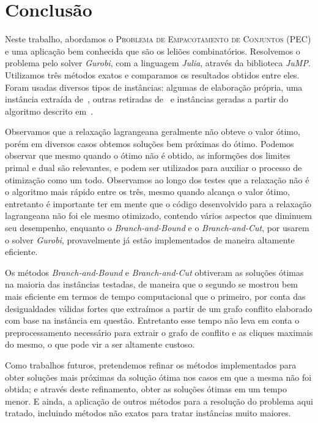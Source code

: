 \documentclass{article}
\begin{document}
    
	\section{Conclusão}\label{sec:concl}
	Neste trabalho, abordamos o \textsc{Problema de Empacotamento de Conjuntos} (PEC) e uma aplicação bem conhecida que são os leliões combinatórios. Resolvemos o problema pelo solver \emph{Gurobi}, com a linguagem \emph{Julia}, através da biblioteca \emph{JuMP}. Utilizamos três métodos exatos e comparamos os resultados obtidos entre eles. Foram usadas diversos tipos de instâncias: algumas de elaboração própria, uma instância extraída de~\cite{Elisa}, outras retiradas de~\cite{benchmarks} e instâncias geradas a partir do algoritmo descrito em~\cite{guo2005using}. 
	
	Observamos que a relaxação lagrangeana geralmente não obteve o valor ótimo, porém em diversos casos obtemos soluções bem próximas do ótimo. Podemos observar que mesmo quando o ótimo não é obtido, as informções dos limites primal e dual são relevantes, e podem ser utilizados para auxiliar o processo de otimização como um todo. Observamos ao longo dos testes que a relaxação não é o algoritmo mais rápido entre os três, mesmo quando alcança o valor ótimo, entretanto é importante ter em mente que o código desenvolvido para a relaxação lagrangeana não foi ele mesmo otimizado, contendo vários aspectos que diminuem seu desempenho, enquanto o \emph{Branch-and-Bound} e o \emph{Branch-and-Cut}, por usarem o solver \emph{Gurobi}, provavelmente já estão implementados de maneira altamente eficiente.
	
	Os métodos \emph{Branch-and-Bound} e \emph{Branch-and-Cut} obtiveram as soluções ótimas na maioria das instâncias testadas, de maneira que o segundo se mostrou bem mais eficiente em termos de tempo computacional que o primeiro, por conta das desigualdades válidas fortes que extraímos a partir de um grafo conflito elaborado com base na instância em questão. Entretanto esse tempo não leva em conta o preprocessamento necessário para extrair o grafo de conflito e as cliques maximais do mesmo, o que pode vir a ser altamente custoso.
	
	Como trabalhos futuros, pretendemos refinar os métodos implementados para obter soluções mais próximas da solução ótima nos casos em que a mesma não foi obtida; e através deste refinamento, obter as soluções ótimas em um tempo menor. E ainda, a aplicação de outros métodos para a resolução do problema aqui tratado, incluindo métodos não exatos para tratar instâncias muito maiores.
	



\end{document}
